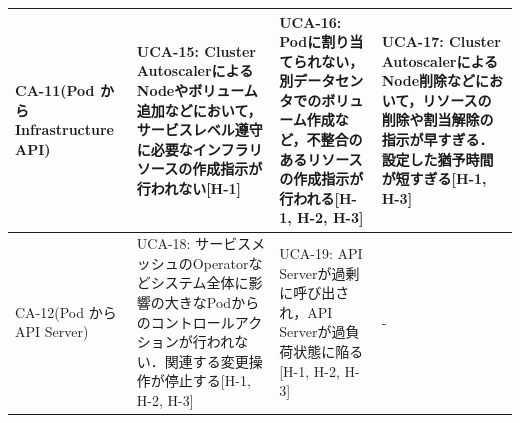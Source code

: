 \documentclass[12pt,a4j]{ujreport}
\begin{document}
\begin{footnotesize}
\begin{tabularx}{\linewidth}{
            >{\hsize=0.7\hsize}X|
            >{\hsize=1.1\hsize}X|
            >{\hsize=1.1\hsize}X|
            >{\hsize=1.1\hsize}X
        }
        CA-11(Pod から Infrastructure API)                            & UCA-15: Cluster AutoscalerによるNodeやボリューム追加などにおいて，サービスレベル遵守に必要なインフラリソースの作成指示が行われない[H-1]                                                                                                                                                                                                                                                                                                                                                                    & UCA-16: Podに割り当てられない，別データセンタでのボリューム作成など，不整合のあるリソースの作成指示が行われる[H-1, H-2, H-3]                                                                                                                                                                                                    & UCA-17: Cluster AutoscalerによるNode削除などにおいて，リソースの削除や割当解除の指示が早すぎる．設定した猶予時間が短すぎる[H-1, H-3] \\ \hline
        CA-12(Pod から API Server)                                    & UCA-18: サービスメッシュのOperatorなどシステム全体に影響の大きなPodからのコントロールアクションが行われない．関連する変更操作が停止する[H-1, H-2, H-3]                                                                                                                                                                                                                                                                                                                                                     & UCA-19: API Serverが過剰に呼び出され，API Serverが過負荷状態に陥る[H-1, H-2, H-3]                                                                                                                                                                                                                                               & -                                                                                                                                    \\ \hline

\end{tabularx}
\end{footnotesize}
\end{document}
